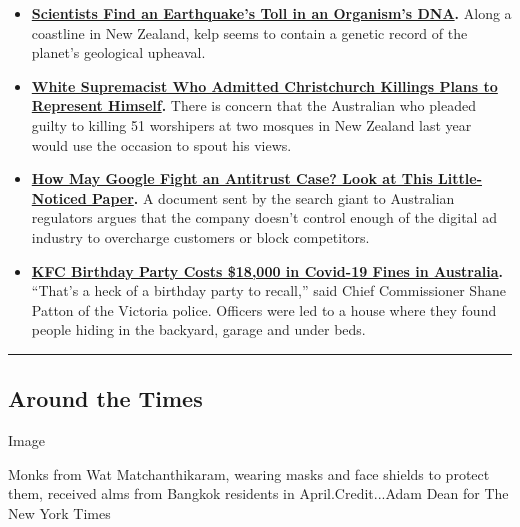 \begin{itemize}
\item
  \textbf{\href{https://www.nytimes3xbfgragh.onion/2020/07/14/science/earthquake-dna-genes-kelp.html}{Scientists
  Find an Earthquake's Toll in an Organism's DNA}.} Along a coastline in
  New Zealand, kelp seems to contain a genetic record of the planet's
  geological upheaval.
\item
  \textbf{\href{https://www.nytimes3xbfgragh.onion/2020/07/13/world/australia/christchurch-mosque-killings-sentencing.html}{White
  Supremacist Who Admitted Christchurch Killings Plans to Represent
  Himself}.} There is concern that the Australian who pleaded guilty to
  killing 51 worshipers at two mosques in New Zealand last year would
  use the occasion to spout his views.
\item
  \textbf{\href{https://www.nytimes3xbfgragh.onion/2020/07/13/technology/google-ads-antitrust.html}{How
  May Google Fight an Antitrust Case? Look at This Little-Noticed
  Paper}.} A document sent by the search giant to Australian regulators
  argues that the company doesn't control enough of the digital ad
  industry to overcharge customers or block competitors.
\item
  \textbf{\href{https://www.nytimes3xbfgragh.onion/2020/07/10/world/australia/kfc-party-fines-australia.html}{KFC
  Birthday Party Costs \$18,000 in Covid-19 Fines in Australia}.}
  ``That's a heck of a birthday party to recall,'' said Chief
  Commissioner Shane Patton of the Victoria police. Officers were led to
  a house where they found people hiding in the backyard, garage and
  under beds.
\end{itemize}

\begin{center}\rule{0.5\linewidth}{\linethickness}\end{center}

\hypertarget{around-the-times}{%
\subsection{Around the Times}\label{around-the-times}}

Image

Monks from Wat Matchanthikaram, wearing masks and face shields to
protect them, received alms from Bangkok residents in
April.Credit...Adam Dean for The New York Times

